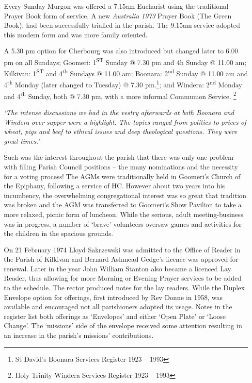 Every Sunday Murgon was offered a 7.15am Eucharist using the traditional Prayer Book form of service. A new \emph{Australia 1973} Prayer Book (The Green Book), had been successfully trialled in the parish. The 9.15am service adopted this modern form and was more family oriented.



A 5.30 pm option for Cherbourg was also introduced but changed later to 6.00 pm on all Sundays; Goomeri: 1\textsuperscript{ST} Sunday @ 7.30 pm and 4h Sunday @ 11.00 am; Kilkivan: 1\textsuperscript{ST} and 4\textsuperscript{th} Sundays @ 11.00 am; Boonara: 2\textsuperscript{nd} Sunday @ 11.00 am and 4\textsuperscript{th} Monday (later changed to Tuesday) @ 7.30 pm.\footnote{St David's Boonara Services Register 1923 -- 1993}; and Windera: 2\textsuperscript{nd} Monday and 4\textsuperscript{th} Sunday, both @ 7.30 pm, with a more informal Communion Service. \footnote{Holy Trinity Windera Services Register 1923 -- 1993}


\emph{`The intense discussions we had in the vestry afterwards at both Boonara and Windera over supper were a highlight. The topics ranged from politics to prices of wheat, pigs and beef to ethical issues and deep theological questions. They were great times.'}



Such was the interest throughout the parish that there was only one problem with filling Parish Council positions -- the many nominations and the necessity for a voting process! The AGMs were traditionally held in Goomeri's Church of the Epiphany, following a service of HC. However about two years into his incumbency, the overwhelming congregational interest was so great that tradition was broken and the AGM was transferred to Goomeri's Show Pavilion to take a more relaxed, picnic form of luncheon. While the serious, adult meeting-business was in progress, a number of `brave' volunteers oversaw games and activities for the children in the spacious grounds.



On 21 February 1974 Lloyd Sakrzewski was admitted to the Office of Reader in the Parish of Kilkivan and Bernard Ashmead Gedge's licence was approved for renewal. Later in the year John William Stanton also became a licenced Lay Reader, thus allowing for more Morning or Evening Prayer services to be added to the schedule. The rector produced notes for the lay readers. While the Duplex Envelope option for offerings, first introduced by Rev Donne in 1958, was available and encouraged not all parishioners adopted its usage. Notes in the register list both offerings as `Envelopes' and either `Open Plate' or `Loose Change'. The `missions' side of the envelope received some attention resulting in an increase in the parish's missions' contributions.









